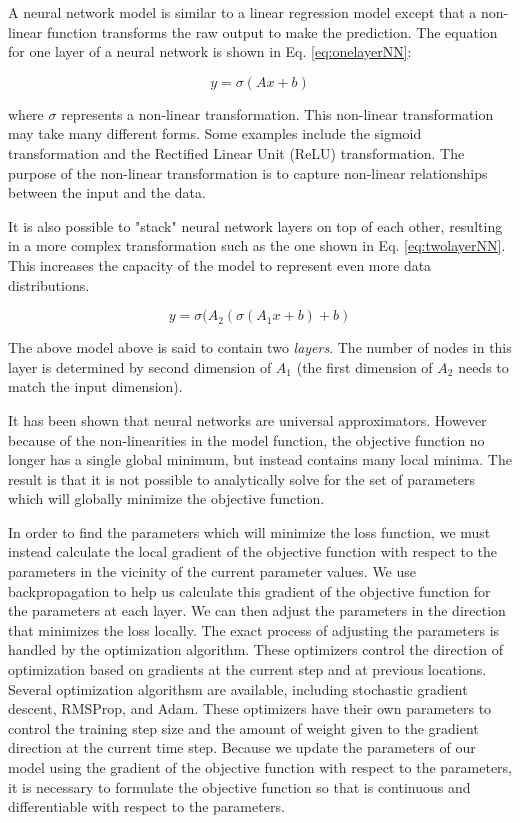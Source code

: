A neural network model\cite{Schmidhuber_NN_Overview} is similar to a linear regression model except that a non-linear function transforms the raw output to make the prediction. The equation for one layer of a neural network is shown in Eq. \eqref{eq:onelayerNN}:

\begin{equation}\label{eq:onelayerNN}
y = \sigma( Ax + b)
\end{equation}

where $\sigma$ represents a non-linear transformation. This non-linear transformation may take many different forms. Some examples include the sigmoid transformation and the Rectified Linear Unit (ReLU) transformation\cite{Nair2010ReLU,lecun_efficient_backprop}. The purpose of the non-linear transformation is to capture non-linear relationships between the input and the data.

It is also possible to "stack" neural network layers on top of each other, resulting in a more complex transformation such as the one shown in Eq. \eqref{eq:twolayerNN}. This increases the capacity of the model to represent even more data distributions. 

\begin{equation}\label{eq:twolayerNN}
y = \sigma( A_2 ( \sigma(A_1 x + b) + b)
\end{equation}

The above model above is said to contain two \textit{layers}. The number of nodes in this layer is determined by second dimension of $A_1$ (the first dimension of $A_2$ needs to match the input dimension).

It has been shown that neural networks are universal approximators\cite{Kolmogorov:57,hornik1989}. However because of the non-linearities in the model function, the objective function no longer has a single global minimum, but instead contains many local minima. The result is that it is not possible to analytically solve for the set of parameters which will globally minimize the objective function.

In order to find the parameters which will minimize the loss function, we must instead calculate the local gradient of the objective function with respect to the parameters in the vicinity of the current parameter values. We use backpropagation\cite{lecun_efficient_backprop} to help us calculate this gradient of the objective function for the parameters at each layer. We can then adjust the parameters in the direction that minimizes the loss locally. 
The exact process of adjusting the parameters is handled by the optimization algorithm. These optimizers control the direction of optimization based on gradients at the current step and at previous locations. Several optimization algorithsm are available, including stochastic gradient descent, RMSProp\cite{Tieleman2012}, and Adam\cite{Kingma_adam_optimizer}. 
These optimizers have their own parameters to control the training step size and the amount of weight given to the gradient direction at the current time step. 
Because we update the parameters of our model using the gradient of the objective function with respect to the parameters, it is necessary to formulate the objective function so that is continuous and differentiable with respect to the parameters.

